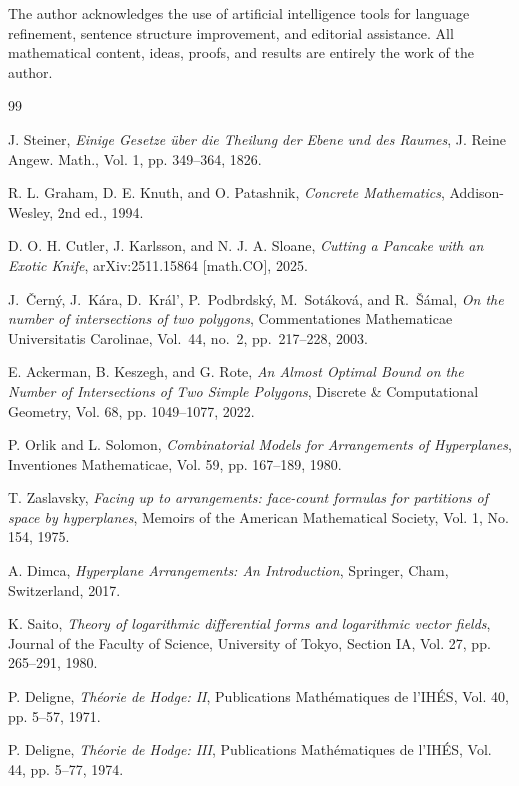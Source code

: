 \documentclass[article,11pt]{amsart} \numberwithin{equation}{section}
\numberwithin{equation}{section}
\begin{document}
{The author acknowledges the use of artificial intelligence tools for language refinement, sentence structure improvement, and editorial assistance. All mathematical content, ideas, proofs, and results are entirely the work of the author.


\begin{thebibliography}{99}
	
	J. Steiner, {\it Einige Gesetze über die Theilung der Ebene und des Raumes},
	J. Reine Angew. Math., Vol. 1, pp. 349--364, 1826.
	
	R. L. Graham, D. E. Knuth, and O. Patashnik, {\it Concrete Mathematics},
	Addison-Wesley, 2nd ed., 1994.
	
	D. O. H. Cutler, J. Karlsson, and N. J. A. Sloane,
	{\it Cutting a Pancake with an Exotic Knife},
	arXiv:2511.15864 [math.CO], 2025.
	
	J.~Čern\'y, J.~K\'ara, D.~Kr\'al', P.~Podbrdsk\'y, M.~Sot\'akov\'a, and R.~\v{S}\'amal,
	\emph{On the number of intersections of two polygons},
	Commentationes Mathematicae Universitatis Carolinae,
	Vol.~44, no.~2, pp.~217--228, 2003.
	
	E. Ackerman, B. Keszegh, and G. Rote,
	{\it An Almost Optimal Bound on the Number of Intersections of Two Simple Polygons},
	Discrete \& Computational Geometry, Vol. 68, pp. 1049--1077, 2022.
	
	P. Orlik and L. Solomon,
	{\it Combinatorial Models for Arrangements of Hyperplanes},
	Inventiones Mathematicae, Vol. 59, pp. 167--189, 1980.
	
	T. Zaslavsky,
	{\it Facing up to arrangements: face-count formulas for partitions of space by hyperplanes},
	Memoirs of the American Mathematical Society, Vol. 1, No. 154, 1975.
	
	A. Dimca,
	{\it Hyperplane Arrangements: An Introduction},
	Springer, Cham, Switzerland, 2017.
	
	K. Saito,
	{\it Theory of logarithmic differential forms and logarithmic vector fields},
	Journal of the Faculty of Science, University of Tokyo, Section IA, Vol. 27, pp. 265--291, 1980.
	
	P. Deligne,
	{\it Théorie de Hodge: II},
	Publications Mathématiques de l'IHÉS, Vol. 40, pp. 5--57, 1971.
	
	P. Deligne,
	{\it Théorie de Hodge: III},
	Publications Mathématiques de l'IHÉS, Vol. 44, pp. 5--77, 1974.
	

\end{thebibliography}}
\end{document}
